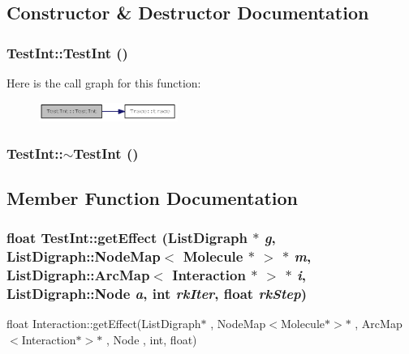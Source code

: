\subsection{Constructor \& Destructor Documentation}
\hypertarget{classTestInt_ae60099905c20a07851e869710024f416}{
\subsubsection[{TestInt}]{\setlength{\rightskip}{0pt plus 5cm}TestInt::TestInt ()}}
\label{classTestInt_ae60099905c20a07851e869710024f416}


Here is the call graph for this function:\nopagebreak
\begin{figure}[H]
\begin{center}
\leavevmode
\includegraphics[width=128pt]{classTestInt_ae60099905c20a07851e869710024f416_cgraph}
\end{center}
\end{figure}
\hypertarget{classTestInt_a3a50d31f6bc9d3e255fd6c4b6367c33d}{
\subsubsection[{$\sim$TestInt}]{\setlength{\rightskip}{0pt plus 5cm}TestInt::$\sim$TestInt ()}}
\label{classTestInt_a3a50d31f6bc9d3e255fd6c4b6367c33d}


\subsection{Member Function Documentation}
\hypertarget{classTestInt_a7e6d8e60a2ebc357052a7776244893d7}{
\subsubsection[{getEffect}]{\setlength{\rightskip}{0pt plus 5cm}float TestInt::getEffect (ListDigraph $\ast$ {\em g}, \/  ListDigraph::NodeMap$<$ {\bf Molecule} $\ast$ $>$ $\ast$ {\em m}, \/  ListDigraph::ArcMap$<$ {\bf Interaction} $\ast$ $>$ $\ast$ {\em i}, \/  ListDigraph::Node {\em a}, \/  int {\em rkIter}, \/  float {\em rkStep})}}
\label{classTestInt_a7e6d8e60a2ebc357052a7776244893d7}
float Interaction::getEffect(ListDigraph$\ast$ , NodeMap$<$Molecule$\ast$$>$$\ast$ , ArcMap$<$Interaction$\ast$$>$$\ast$ , Node , int, float)


